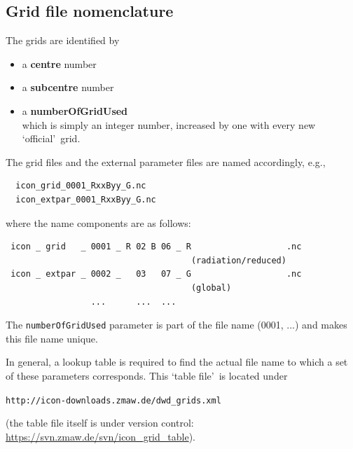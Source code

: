 \subsection{Grid file nomenclature}
The grids are identified by
\begin{itemize}
\item a \textbf{centre} number
\item a \textbf{subcentre} number
\item a \textbf{numberOfGridUsed}\\
which is simply an integer number, increased by one with every new \lq official\rq\ grid.  
\end{itemize}

The grid files and the external parameter files are named accordingly, e.g.,
\begin{small}
 \begin{verbatim}
  icon_grid_0001_RxxByy_G.nc
  icon_extpar_0001_RxxByy_G.nc 
 \end{verbatim}
\end{small}
where the name components are as follows:
\begin{small}
 \begin{verbatim}
 icon _	grid   _ 0001 _	R 02 B 06 _	R                   .nc 
                                     (radiation/reduced)
 icon _ extpar _ 0002 _	  03   07 _	G                   .nc
                                     (global)         
                 ...      ...  ...
 \end{verbatim}
\end{small}

The \verb+numberOfGridUsed+ parameter is part of the file name (0001, ...) and makes this file name unique.

In general, a lookup table is required to find the actual file name to which a set of these parameters corresponds. 
This \lq table file\rq\ is located under 
\begin{center}
  {\tt http://icon-downloads.zmaw.de/dwd\_grids.xml} 
\end{center}
(the table file itself is under version control: \href{https://svn.zmaw.de/svn/icon\_grid\_table}{https://svn.zmaw.de/svn/icon\_grid\_table}). 



